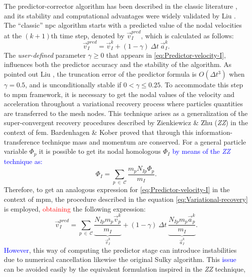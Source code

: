 \documentclass[preprint,12pt,a4paper]{elsarticle}
\begin{document}
The predictor-corrector algorithm has
been described in the classic literature \cite{Hughes2000}, and its
stability and computational advantages were widely validated by Liu
\cite{Xiaojian94}. The ``classic'' \acrfull{npc} algorithm starts with a
predicted value of the nodal velocities at the $(k+1)$th time step, {\color{blue}denoted by $\vec{v}_{I}^{pred}$, which is calculated as follows:
\begin{equation}
  \label{eq:Predictor-velocity-I}
  \vec{v}_{I}^{pred} = \vec{v}_I^k + (1 - \gamma)\ \Delta t\ \vec{a}_I^k.
\end{equation}
}
The \textit{user-defined}
parameter $\gamma \geq 0$ that appears in \eqref{eq:Predictor-velocity-I}, influences both the predictor accuracy
and the stability of the algorithm. As pointed out Liu
\cite{Xiaojian94}, the truncation error of the predictor formula is
$O(\Delta t^3)$ when $\gamma = 0.5$, and is unconditionally stable if
$ 0 < \gamma \leq 0.25$. To accommodate this step to \acrshort{mpm} framework, it is necessary to get the nodal values of the velocity and acceleration throughout a variational recovery process where particles quantities are transferred to the mesh nodes. This technique arises as a generalization of the super-convergent recovery
procedures described by Zienkiewicz \& Zhu \cite{ZZ1992_I} (\textit{ZZ}) in the context of \acrshort{fem}. Bardenhagen \& Kober \cite{Bardenhagen2004} proved that through this information-transference technique mass and momentum are conserved. For a general particle variable $\Phi_p$ it is possible to get its nodal homologous $\Phi_I$ \textcolor{blue}{by means of the \textit{ZZ} technique as:}
{\color{red}
\begin{equation}
  \label{eq:Variational-recovery}
   \Phi_I = \sum_{p\ \in\ \mathcal{C}} \frac{m_p N_{Ip} \Phi_p}{m_I}.
 \end{equation}
 }
 Therefore, to get an analogous expression for
 \eqref{eq:Predictor-velocity-I} in the context of \acrshort{mpm}, the
 procedure described in the equation \eqref{eq:Variational-recovery}
 is employed, \textcolor{red}{obtaining} the following expression:
 {\color{red}
 \begin{equation}
   \label{eq:Predictor-velocity-II}
   \vec{v}_{I}^{pred} = \sum_{p\ \in\ \mathcal{C}} \underbrace{\frac{N_{Ip} m_p
       \vec{v}_p^k}{m_I}}_{\vec{v}_I^{k}} + (1 - \gamma)\ \Delta t\  \underbrace{\frac{N_{Ip} m_p \vec{a}_p^k}{m_I}}_{\vec{a}_I^{k}}.
 \end{equation}
 }
\textcolor{blue}{However}, this way of computing the predictor stage can introduce instabilities due to numerical cancellation likewise the original Sulky algorithm. This \textcolor{blue}{issue} can be avoided easily by the equivalent formulation inspired in the \textit{ZZ} technique,
\end{document}
